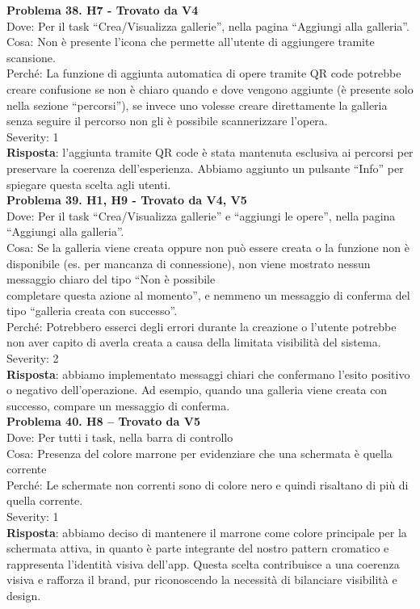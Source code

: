 \documentclass{article}
\begin{document}
\noindent \textbf{Problema 38. H7 - Trovato da V4} \\
Dove: Per il task “Crea/Visualizza gallerie”, nella pagina “Aggiungi alla galleria”. \\
Cosa: Non è presente l’icona che permette all’utente di aggiungere tramite scansione. \\
Perché: La funzione di aggiunta automatica di opere tramite QR code potrebbe creare confusione se non è chiaro quando e dove vengono aggiunte (è presente solo nella sezione “percorsi”), se invece uno volesse creare direttamente la galleria senza seguire il percorso non gli è possibile scannerizzare l’opera. \\
Severity: 1 \\
\textbf{Risposta}: l’aggiunta tramite QR code è stata mantenuta esclusiva ai percorsi per preservare la coerenza dell’esperienza. Abbiamo aggiunto un pulsante “Info” per spiegare questa scelta agli utenti. \\

\noindent \textbf{Problema 39. H1, H9 - Trovato da V4, V5} \\
Dove: Per il task “Crea/Visualizza gallerie” e “aggiungi le opere”, nella pagina “Aggiungi alla galleria”. \\
Cosa: Se la galleria viene creata oppure non può essere creata o la funzione non è disponibile (es. per mancanza di connessione), non viene mostrato nessun messaggio chiaro del tipo “Non è possibile \\ completare questa azione al momento”, e nemmeno un messaggio di conferma del tipo “galleria creata con successo”. \\
Perché: Potrebbero esserci degli errori durante la creazione o l’utente potrebbe non aver capito di averla creata a causa della limitata visibilità del sistema. \\
Severity: 2 \\
\textbf{Risposta}: abbiamo implementato messaggi chiari che confermano l’esito positivo o negativo dell’operazione. Ad esempio, quando una galleria viene creata con successo, compare un messaggio di conferma. \\

\noindent \textbf{Problema 40. H8 – Trovato da V5} \\
Dove: Per tutti i task, nella barra di controllo \\
Cosa: Presenza del colore marrone per evidenziare che una schermata è quella corrente \\
Perché: Le schermate non correnti sono di colore nero e quindi risaltano di più di quella corrente. \\
Severity: 1 \\
\textbf{Risposta}: abbiamo deciso di mantenere il marrone come colore principale per la schermata attiva, in quanto è parte integrante del nostro pattern cromatico e rappresenta l’identità visiva dell’app. Questa scelta contribuisce a una coerenza visiva e rafforza il brand, pur riconoscendo la necessità di bilanciare visibilità e design.\\
\end{document}
